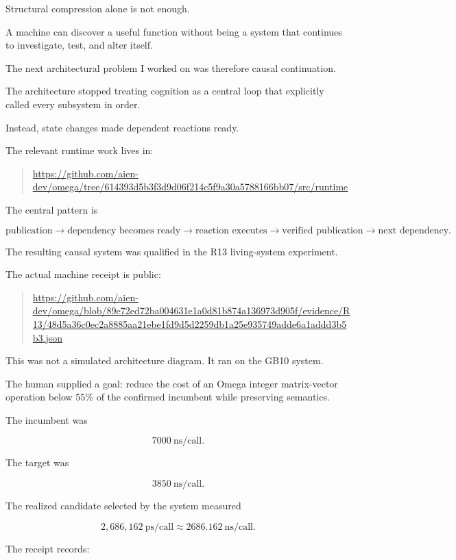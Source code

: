 \documentclass[11pt]{article}
\begin{document}
Structural compression alone is not enough.

A machine can discover a useful function without being a system that continues to investigate, test, and alter itself.

The next architectural problem I worked on was therefore causal continuation.

The architecture stopped treating cognition as a central loop that explicitly called every subsystem in order.

Instead, state changes made dependent reactions ready.

The relevant runtime work lives in:

\begin{quote}
\url{https://github.com/aien-dev/omega/tree/614393d5b3f3d9d06f214c5f9a30a5788166bb07/src/runtime}
\end{quote}

The central pattern is

\[
\text{publication}
\rightarrow
\text{dependency becomes ready}
\rightarrow
\text{reaction executes}
\rightarrow
\text{verified publication}
\rightarrow
\text{next dependency}.
\]

The resulting causal system was qualified in the R13 living-system experiment.

The actual machine receipt is public:

\begin{quote}
\url{https://github.com/aien-dev/omega/blob/89e72ed72ba004631e1a0d81b874a136973d905f/evidence/R13/48d5a36c0ec2a8885aa21ebe1fd9d5d2259db1a25e935749adde6a1addd3b5b3.json}
\end{quote}

This was not a simulated architecture diagram. It ran on the GB10 system.

The human supplied a goal: reduce the cost of an Omega integer matrix-vector operation below \(55\%\) of the confirmed incumbent while preserving semantics.

The incumbent was

\[
7000\ \mathrm{ns/call}.
\]

The target was

\[
3850\ \mathrm{ns/call}.
\]

The realized candidate selected by the system measured

\[
2{,}686{,}162\ \mathrm{ps/call}
\approx
2686.162\ \mathrm{ns/call}.
\]

The receipt records:
\end{document}
